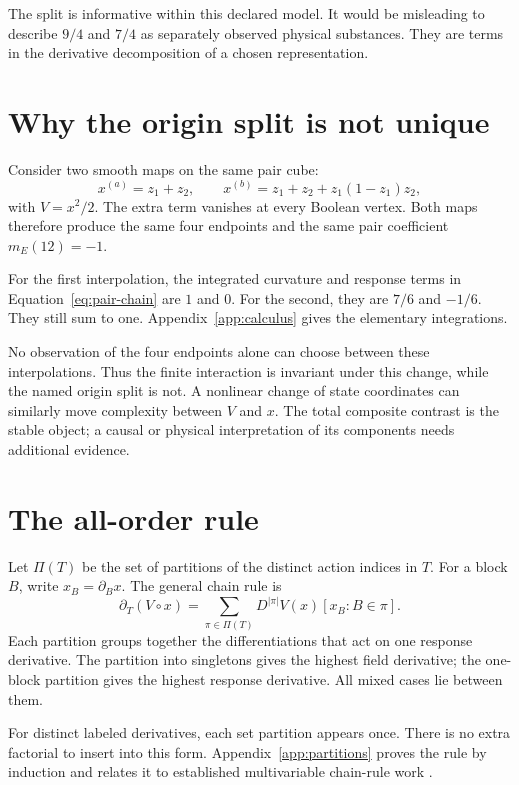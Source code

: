 The split is informative within this declared model. It would be misleading to describe $9/4$ and $7/4$ as separately observed physical substances. They are terms in the derivative decomposition of a chosen representation.

\section{Why the origin split is not unique}
Consider two smooth maps on the same pair cube:
\begin{equation}
 x^{(a)}=z_1+z_2,\qquad
 x^{(b)}=z_1+z_2+z_1(1-z_1)z_2,
\end{equation}
with $V=x^2/2$. The extra term vanishes at every Boolean vertex. Both maps therefore produce the same four endpoints and the same pair coefficient $m_E(12)=-1$.

For the first interpolation, the integrated curvature and response terms in Equation~\ref{eq:pair-chain} are $1$ and $0$. For the second, they are $7/6$ and $-1/6$. They still sum to one. Appendix~\ref{app:calculus} gives the elementary integrations.

No observation of the four endpoints alone can choose between these interpolations. Thus the finite interaction is invariant under this change, while the named origin split is not. A nonlinear change of state coordinates can similarly move complexity between $V$ and $x$. The total composite contrast is the stable object; a causal or physical interpretation of its components needs additional evidence.

\section{The all-order rule}
Let $\Pi(T)$ be the set of partitions of the distinct action indices in $T$. For a block $B$, write $x_B=\partial_Bx$. The general chain rule is
\begin{equation}\label{eq:partition-rule}
 \partial_T(V\circ x)
 =\sum_{\pi\in\Pi(T)}D^{|\pi|}V(x)[x_B:B\in\pi].
\end{equation}
Each partition groups together the differentiations that act on one response derivative. The partition into singletons gives the highest field derivative; the one-block partition gives the highest response derivative. All mixed cases lie between them.

For distinct labeled derivatives, each set partition appears once. There is no extra factorial to insert into this form. Appendix~\ref{app:partitions} proves the rule by induction and relates it to established multivariable chain-rule work \cite{hardy}.

